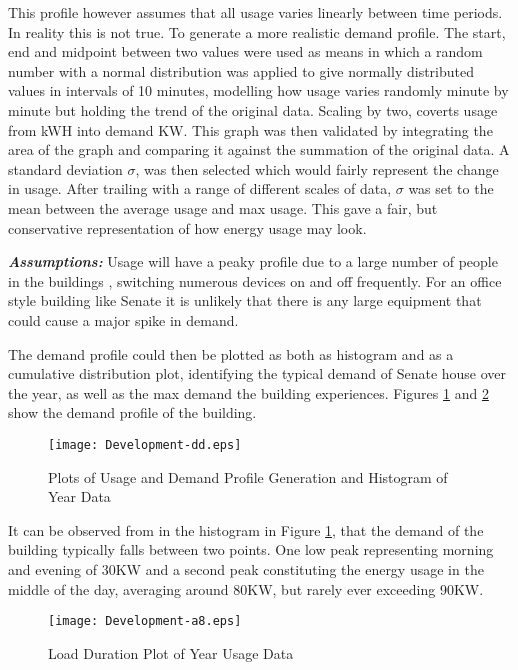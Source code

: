 This profile however assumes that all usage varies linearly between time
periods. In reality this is not true. To generate a more realistic
demand profile. The start, end and midpoint between two values were used
as means in which a random number with a normal distribution was applied
to give normally distributed values in intervals of 10 minutes,
modelling how usage varies randomly minute by minute but holding the
trend of the original data. Scaling by two, coverts usage from kWH into
demand KW. This graph was then validated by integrating the area of the
graph and comparing it against the summation of the original data. A
standard deviation \(\sigma\), was then selected which would fairly
represent the change in usage. After trailing with a range of different
scales of data, \(\sigma\) was set to the mean between the average usage
and max usage. This gave a fair, but conservative representation of how
energy usage may look.

\textbf{\emph{Assumptions:}} Usage will have a peaky profile due to a
large number of people in the buildings , switching numerous devices on
and off frequently. For an office style building like Senate it is
unlikely that there is any large equipment that could cause a major
spike in demand.

The demand profile could then be plotted as both as histogram and as a
cumulative distribution plot, identifying the typical demand of Senate
house over the year, as well as the max demand the building experiences.
Figures \ref{Development-dd} and \ref{Development-a8} show the demand
profile of the building.

\begin{figure}[H]
 \centering
 \texttt{[image: Development-dd.eps]}
 \caption{Plots of Usage and Demand Profile Generation and Histogram of Year Data}
 \label{Development-dd}
 \end{figure}

It can be observed from in the histogram in Figure \ref{Development-dd},
that the demand of the building typically falls between two points. One
low peak representing morning and evening of 30KW and a second peak
constituting the energy usage in the middle of the day, averaging around
80KW, but rarely ever exceeding 90KW.

\begin{figure}[H]
 \centering
 \texttt{[image: Development-a8.eps]}
 \caption{Load Duration Plot of Year Usage Data}
 \label{Development-a8}
 \end{figure}

